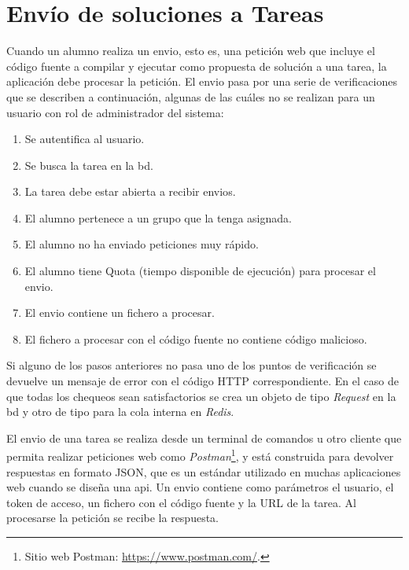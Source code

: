 \documentclass[11pt,spanish,listoffigures,listoftables]{tfgetsinf}
\begin{document}
\section{Envío de soluciones a Tareas}

Cuando un \Gls{alumno} realiza un \Gls{envio}, esto es, una petición web que incluye el código fuente a compilar y ejecutar como propuesta de solución a una \Gls{tarea}, la aplicación debe procesar la petición. El \Gls{envio} pasa por una serie de verificaciones que se describen a continuación, algunas de las cuáles no se realizan para un usuario con rol de \gls{administrador} del sistema:

\begin{enumerate}
	\item Se autentifica al usuario.
	\item Se busca la \Gls{tarea} en la \Gls{bd}.
	\item La \Gls{tarea} debe estar abierta a recibir \Gls{envio}s.
	\item El \Gls{alumno} pertenece a un \Gls{grupo} que la tenga asignada.
	\item El \Gls{alumno} no ha enviado peticiones muy rápido.
	\item El \Gls{alumno} tiene Quota (tiempo disponible de ejecución) para procesar el \Gls{envio}.
	\item El \Gls{envio} contiene un fichero a procesar.
	\item El fichero a procesar con el código fuente no contiene código malicioso.
\end{enumerate}

Si alguno de los pasos anteriores no pasa uno de los puntos de verificación se devuelve un mensaje de error con el código HTTP correspondiente. En el caso de que todas los chequeos sean satisfactorios se crea un objeto de tipo \textit{Request} en la \acrshort{bd} y otro de tipo  para la \Gls{cola} interna en \textit{Redis}.

El \Gls{envio} de una \Gls{tarea} se realiza desde un terminal de comandos u otro cliente que permita realizar peticiones web como \textit{Postman}\footnote{Sitio web Postman: \url{https://www.postman.com/}.}, y está construida para devolver respuestas en formato JSON, que es un estándar utilizado en muchas aplicaciones web cuando se diseña una \acrshort{api}. Un \Gls{envio} contiene como parámetros el usuario, el token de acceso, un fichero con el código fuente y la URL de la \Gls{tarea}. Al procesarse la petición se recibe la respuesta.
\end{document}
